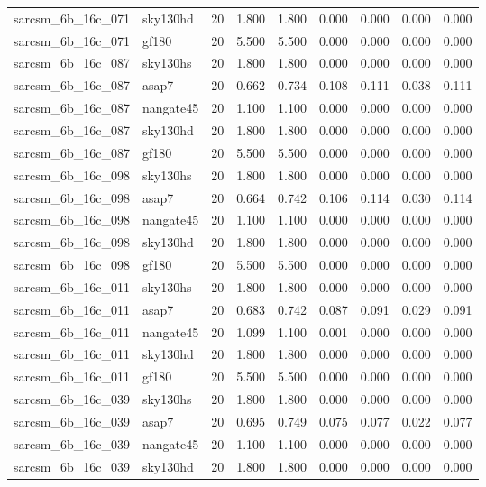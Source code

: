 \begin{tabular}{llrrrrrrr}
sarcsm\_6b\_16c\_071 & sky130hd & 20 & 1.800 & 1.800 & 0.000 & 0.000 & 0.000 & 0.000 \\
sarcsm\_6b\_16c\_071 & gf180 & 20 & 5.500 & 5.500 & 0.000 & 0.000 & 0.000 & 0.000 \\
sarcsm\_6b\_16c\_087 & sky130hs & 20 & 1.800 & 1.800 & 0.000 & 0.000 & 0.000 & 0.000 \\
sarcsm\_6b\_16c\_087 & asap7 & 20 & 0.662 & 0.734 & 0.108 & 0.111 & 0.038 & 0.111 \\
sarcsm\_6b\_16c\_087 & nangate45 & 20 & 1.100 & 1.100 & 0.000 & 0.000 & 0.000 & 0.000 \\
sarcsm\_6b\_16c\_087 & sky130hd & 20 & 1.800 & 1.800 & 0.000 & 0.000 & 0.000 & 0.000 \\
sarcsm\_6b\_16c\_087 & gf180 & 20 & 5.500 & 5.500 & 0.000 & 0.000 & 0.000 & 0.000 \\
sarcsm\_6b\_16c\_098 & sky130hs & 20 & 1.800 & 1.800 & 0.000 & 0.000 & 0.000 & 0.000 \\
sarcsm\_6b\_16c\_098 & asap7 & 20 & 0.664 & 0.742 & 0.106 & 0.114 & 0.030 & 0.114 \\
sarcsm\_6b\_16c\_098 & nangate45 & 20 & 1.100 & 1.100 & 0.000 & 0.000 & 0.000 & 0.000 \\
sarcsm\_6b\_16c\_098 & sky130hd & 20 & 1.800 & 1.800 & 0.000 & 0.000 & 0.000 & 0.000 \\
sarcsm\_6b\_16c\_098 & gf180 & 20 & 5.500 & 5.500 & 0.000 & 0.000 & 0.000 & 0.000 \\
sarcsm\_6b\_16c\_011 & sky130hs & 20 & 1.800 & 1.800 & 0.000 & 0.000 & 0.000 & 0.000 \\
sarcsm\_6b\_16c\_011 & asap7 & 20 & 0.683 & 0.742 & 0.087 & 0.091 & 0.029 & 0.091 \\
sarcsm\_6b\_16c\_011 & nangate45 & 20 & 1.099 & 1.100 & 0.001 & 0.000 & 0.000 & 0.000 \\
sarcsm\_6b\_16c\_011 & sky130hd & 20 & 1.800 & 1.800 & 0.000 & 0.000 & 0.000 & 0.000 \\
sarcsm\_6b\_16c\_011 & gf180 & 20 & 5.500 & 5.500 & 0.000 & 0.000 & 0.000 & 0.000 \\
sarcsm\_6b\_16c\_039 & sky130hs & 20 & 1.800 & 1.800 & 0.000 & 0.000 & 0.000 & 0.000 \\
sarcsm\_6b\_16c\_039 & asap7 & 20 & 0.695 & 0.749 & 0.075 & 0.077 & 0.022 & 0.077 \\
sarcsm\_6b\_16c\_039 & nangate45 & 20 & 1.100 & 1.100 & 0.000 & 0.000 & 0.000 & 0.000 \\
sarcsm\_6b\_16c\_039 & sky130hd & 20 & 1.800 & 1.800 & 0.000 & 0.000 & 0.000 & 0.000 \\

\end{tabular}
